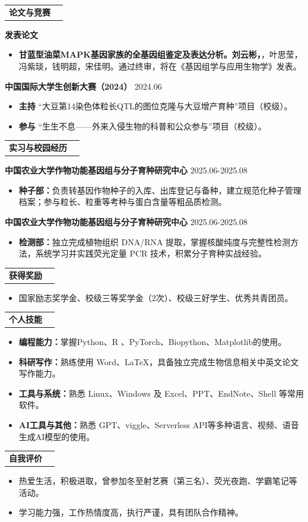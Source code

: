 \documentclass[UTF8]{ctexart} %
\makeatletter
\newcommand{\sectionTitle}[1]{%
  \vspace{2pt}%
  \noindent\begin{tabularx}{\linewidth}{@{}lX@{}}%
    {\color{mainblue}\bfseries\large #1} & \raisebox{0.6ex}{\textcolor{lineblue}{\rule{\linewidth}{0.4pt}}}%
  \end{tabularx}\vspace{1pt}}%
\makeatother
\begin{document}
  \medskip

\sectionTitle{论文与竞赛} %
  \textbf{发表论文}
  \begin{itemize}
    \item \textbf{甘蓝型油菜MAPK基因家族的全基因组鉴定及表达分析。刘云彬，}，叶思莹，冯紫琰，钱明超，宋佳明。通过终审，将在《基因组学与应用生物学》发表。
  \end{itemize}
  \medskip
  \textbf{中国国际大学生创新大赛（2024）} \hfill 2024.06 %
  \begin{itemize} %
    \item \textbf{主持} “大豆第14染色体粒长QTL的图位克隆与大豆增产育种”项目（校级）。 %
    \item \textbf{参与} “生生不息——外来入侵生物的科普和公众参与”项目（校级）。 %
  \end{itemize}

  \medskip

\sectionTitle{实习与校园经历} %
  \textbf{中国农业大学作物功能基因组与分子育种研究中心} \hfill 2025.06-2025.08 %
  \begin{itemize} %
    \item \textbf{种子部：}负责转基因作物种子的入库、出库登记与备种，建立规范化种子管理档案；参与粒长、粒重等考种与蛋白含量等粗品质检测。 %
  \end{itemize}
  \medskip
  \textbf{中国农业大学作物功能基因组与分子育种研究中心} \hfill 2025.06-2025.08 %
  \begin{itemize} %
    \item \textbf{检测部：}独立完成植物组织 DNA/RNA 提取，掌握核酸纯度与完整性检测方法，系统学习并实践荧光定量 PCR 技术，积累分子育种实战经验。 %
  \end{itemize}
\sectionTitle{获得奖励} %
  \begin{itemize} %
    \item 国家励志奖学金、校级三等奖学金（2次）、校级三好学生、优秀共青团员。 
  \end{itemize}

  \medskip

\sectionTitle{个人技能} %
  \begin{itemize} %
    \item \textbf{编程能力：}掌握Python、R 、PyTorch、Biopython、Matplotlib的使用。 %
    \item \textbf{科研写作：}熟练使用 Word、\LaTeX，具备独立完成生物信息相关中英文论文写作能力。 %
    \item \textbf{工具与系统：}熟悉 Linux、Windows 及 Excel、PPT、EndNote、Shell 等常用软件。 %
    \item \textbf{AI工具与其他：}熟悉 GPT、viggle、Serverless API等多种语言、视频、语音生成AI模型的使用。 %
  \end{itemize}

  \medskip

\sectionTitle{自我评价} %
  \begin{itemize} %
    \item 热爱生活，积极进取，曾参加冬至射艺赛（第三名）、荧光夜跑、学霸笔记等活动。 %
    \item 学习能力强，工作热情度高，执行严谨，具有团队合作精神。 %
  \end{itemize}
\end{document}
